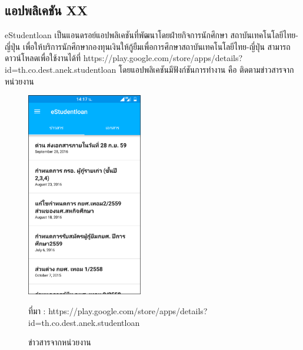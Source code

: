 		 \subsection{แอปพลิเคชัน XX}
		 eStudentloan \cite{eStudentloan} เป็นแอนดรอย์แอปพลิเคชันที่พัฒนาโดยฝ่ายกิจการนักศึกษา สถาบันเทคโนโลยีไทย-ญี่ปุ่น เพื่อให้บริการนักศึกษากองทุนเงินให้กู้ยืมเพื่อการศึกษาสถาบันเทคโนโลยีไทย-ญี่ปุ่น สามารถดาวน์โหลดเพื่อใช้งานได้ที่  https://play.google.com/store/apps/details?id=th.co.dest.anek.studentloan โดยแอปพลิเคชันมีฟังก์ชันการทำงาน คือ ติดตามข่าวสารจากหน่วยงาน 
		 \newpage
	 			\begin{figure}[H]
	 				\centering
	 				\includegraphics[width=0.45\textwidth]{Figures/2/m3}
	 				\caption{ข่าวสารจากหน่วยงาน}{ที่มา : https://play.google.com/store/apps/details?id=th.co.dest.anek.studentloan}
	 				\label{Fig:Studentloan11}
	 			\end{figure}
	
